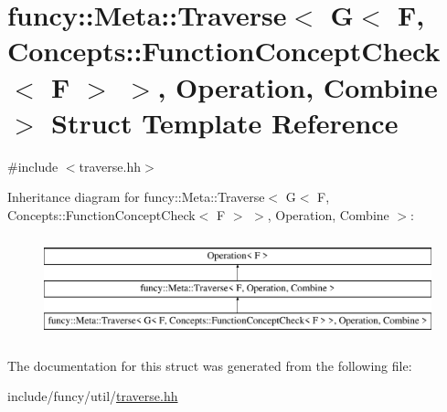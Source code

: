 \hypertarget{structfuncy_1_1Meta_1_1Traverse_3_01G_3_01F_00_01Concepts_1_1FunctionConceptCheck_3_01F_01_4_01_44008b3cc655196582c54171c951cc7a}{\section{funcy\-:\-:Meta\-:\-:Traverse$<$ G$<$ F, Concepts\-:\-:Function\-Concept\-Check$<$ F $>$ $>$, Operation, Combine $>$ Struct Template Reference}
\label{structfuncy_1_1Meta_1_1Traverse_3_01G_3_01F_00_01Concepts_1_1FunctionConceptCheck_3_01F_01_4_01_44008b3cc655196582c54171c951cc7a}
}


{\ttfamily \#include $<$traverse.\-hh$>$}

Inheritance diagram for funcy\-:\-:Meta\-:\-:Traverse$<$ G$<$ F, Concepts\-:\-:Function\-Concept\-Check$<$ F $>$ $>$, Operation, Combine $>$\-:\begin{figure}[H]
\begin{center}
\leavevmode
\includegraphics[height=2.984014cm]{structfuncy_1_1Meta_1_1Traverse_3_01G_3_01F_00_01Concepts_1_1FunctionConceptCheck_3_01F_01_4_01_44008b3cc655196582c54171c951cc7a}
\end{center}
\end{figure}


The documentation for this struct was generated from the following file\-:\begin{DoxyCompactItemize}
\item 
include/funcy/util/\hyperlink{traverse_8hh}{traverse.\-hh}\end{DoxyCompactItemize}
